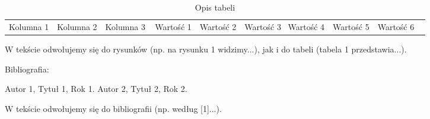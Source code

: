 \documentclass[a4paper,12pt]{article}
\begin{document}
\begin{table}[h]
\centering
\begin{tabular}{@{}ccc@{}}
\toprule
Kolumna 1 & Kolumna 2 & Kolumna 3 \ \midrule
Wartość 1 & Wartość 2 & Wartość 3 \
Wartość 4 & Wartość 5 & Wartość 6 \ \bottomrule
\end{tabular}
\caption{Opis tabeli}
\end{table}

W tekście odwołujemy się do rysunków (np. na rysunku 1 widzimy...), jak i do tabeli (tabela 1 przedstawia...).

Bibliografia:

\begin{thebibliography}{9}
 Autor 1, Tytuł 1, Rok 1.
 Autor 2, Tytuł 2, Rok 2.
\end{thebibliography}

W tekście odwołujemy się do bibliografii (np. według [1]...).
\end{document}
